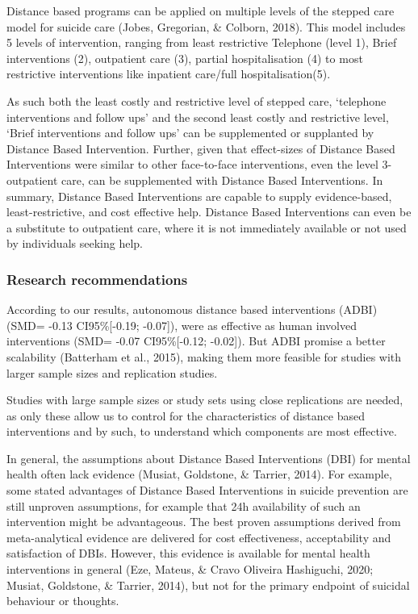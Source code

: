 \documentclass[
  english,
  man]{apa6}
\begin{document}
Distance based programs can be applied on multiple levels of the stepped care model for suicide care (Jobes, Gregorian, \& Colborn, 2018). This model includes 5 levels of intervention, ranging from least restrictive Telephone (level 1), Brief interventions (2), outpatient care (3), partial hospitalisation (4) to most restrictive interventions like inpatient care/full hospitalisation(5).

As such both the least costly and restrictive level of stepped care, `telephone interventions and follow ups' and the second least costly and restrictive level, `Brief interventions and follow ups' can be supplemented or supplanted by Distance Based Intervention. Further, given that effect-sizes of Distance Based Interventions were similar to other face-to-face interventions, even the level 3- outpatient care, can be supplemented with Distance Based Interventions. In summary, Distance Based Interventions are capable to supply evidence-based, least-restrictive, and cost effective help. Distance Based Interventions can even be a substitute to outpatient care, where it is not immediately available or not used by individuals seeking help.

\hypertarget{research-recommendations}{%
\subsubsection{Research recommendations}\label{research-recommendations}}

According to our results, autonomous distance based interventions (ADBI) (SMD= -0.13 CI95\%{[}-0.19; -0.07{]}), were as effective as human involved interventions (SMD= -0.07 CI95\%{[}-0.12; -0.02{]}). But ADBI promise a better scalability (Batterham et al., 2015), making them more feasible for studies with larger sample sizes and replication studies.

Studies with large sample sizes or study sets using close replications are needed, as only these allow us to control for the characteristics of distance based interventions and by such, to understand which components are most effective.

In general, the assumptions about Distance Based Interventions (DBI) for mental health often lack evidence (Musiat, Goldstone, \& Tarrier, 2014). For example, some stated advantages of Distance Based Interventions in suicide prevention are still unproven assumptions, for example that 24h availability of such an intervention might be advantageous. The best proven assumptions derived from meta-analytical evidence are delivered for cost effectiveness, acceptability and satisfaction of DBIs. However, this evidence is available for mental health interventions in general (Eze, Mateus, \& Cravo Oliveira Hashiguchi, 2020; Musiat, Goldstone, \& Tarrier, 2014), but not for the primary endpoint of suicidal behaviour or thoughts.
\end{document}

